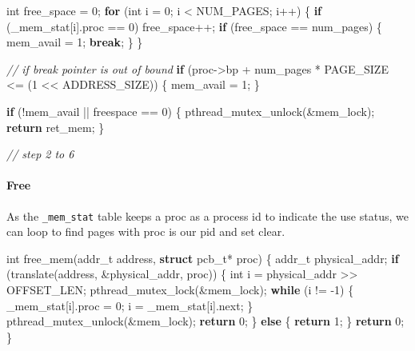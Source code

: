 \documentclass[]{article}
\newenvironment{Shaded}{}{}
\newcommand{\KeywordTok}[1]{\textcolor[rgb]{0.00,0.44,0.13}{\textbf{#1}}}
\newcommand{\DataTypeTok}[1]{\textcolor[rgb]{0.56,0.13,0.00}{#1}}
\newcommand{\DecValTok}[1]{\textcolor[rgb]{0.25,0.63,0.44}{#1}}
\newcommand{\CommentTok}[1]{\textcolor[rgb]{0.38,0.63,0.69}{\textit{#1}}}
\newcommand{\ControlFlowTok}[1]{\textcolor[rgb]{0.00,0.44,0.13}{\textbf{#1}}}
\newcommand{\NormalTok}[1]{#1}
\let\oldparagraph\paragraph
\renewcommand{\paragraph}[1]{\oldparagraph{#1}\mbox{}}
\begin{document}
\begin{Shaded}
\begin{Highlighting}[]
\DataTypeTok{int}\NormalTok{ free_space = }\DecValTok{0}\NormalTok{;}
\ControlFlowTok{for}\NormalTok{ (}\DataTypeTok{int}\NormalTok{ i = }\DecValTok{0}\NormalTok{; i < NUM_PAGES; i++) \{}
      \ControlFlowTok{if}\NormalTok{ (_mem_stat[i].proc == }\DecValTok{0}\NormalTok{)}
\NormalTok{            free_space++;}
      \ControlFlowTok{if}\NormalTok{ (free_space == num_pages) \{}
\NormalTok{            mem_avail = }\DecValTok{1}\NormalTok{;}
            \ControlFlowTok{break}\NormalTok{;}
\NormalTok{      \}}
\NormalTok{\}}

\CommentTok{// if break pointer is out of bound}
\ControlFlowTok{if}\NormalTok{ (proc->bp + num_pages * PAGE_SIZE <= (}\DecValTok{1}\NormalTok{ << ADDRESS_SIZE)) \{}
\NormalTok{      mem_avail = }\DecValTok{1}\NormalTok{;}
\NormalTok{\}}

\ControlFlowTok{if}\NormalTok{ (!mem_avail || freespace == 0) \{}
\NormalTok{      pthread_mutex_unlock(&mem_lock);}
      \ControlFlowTok{return}\NormalTok{ ret_mem;}
\NormalTok{\}}

\CommentTok{// step 2 to 6}
\end{Highlighting}
\end{Shaded}

\paragraph{Free}\label{free}

As the \texttt{\_mem\_stat} table keeps a proc as a process id to
indicate the use status, we can loop to find pages with proc is our pid
and set clear.

\begin{Shaded}
\begin{Highlighting}[]
\DataTypeTok{int}\NormalTok{ free_mem(addr_t address, }\KeywordTok{struct}\NormalTok{ pcb_t* proc) \{}
\NormalTok{        addr_t physical_addr;}
        \ControlFlowTok{if}\NormalTok{ (translate(address, &physical_addr, proc)) \{}
                \DataTypeTok{int}\NormalTok{ i = physical_addr >> OFFSET_LEN;}
\NormalTok{                pthread_mutex_lock(&mem_lock);}
                \ControlFlowTok{while}\NormalTok{ (i != }\DecValTok{-1}\NormalTok{) \{}
\NormalTok{                        _mem_stat[i].proc = }\DecValTok{0}\NormalTok{;}
\NormalTok{                        i = _mem_stat[i].next;}
\NormalTok{                \}}
\NormalTok{                pthread_mutex_unlock(&mem_lock);}
                \ControlFlowTok{return} \DecValTok{0}\NormalTok{;}
\NormalTok{        \} }\ControlFlowTok{else}\NormalTok{ \{}
                \ControlFlowTok{return} \DecValTok{1}\NormalTok{;}
\NormalTok{        \}}
        \ControlFlowTok{return} \DecValTok{0}\NormalTok{;}
\NormalTok{\}}
\end{Highlighting}
\end{Shaded}
\end{document}
